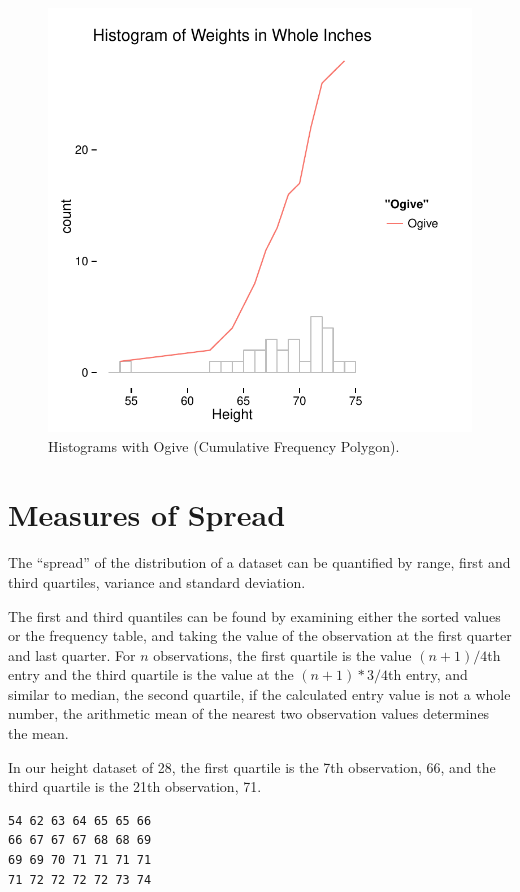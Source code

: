 \documentclass[nohyper,justified]{tufte-handout}\usepackage[]{graphicx}\usepackage[]{color}
\makeatletter
\newenvironment{kframe}{%
 \def\at@end@of@kframe{}%
 \ifinner\ifhmode%
  \def\at@end@of@kframe{\end{minipage}}%
  \begin{minipage}{\columnwidth}%
 \fi\fi%
 \def\FrameCommand##1{\hskip\@totalleftmargin \hskip-\fboxsep
 \colorbox{shadecolor}{##1}\hskip-\fboxsep
     \hskip-\linewidth \hskip-\@totalleftmargin \hskip\columnwidth}%
 \MakeFramed {\advance\hsize-\width
   \@totalleftmargin\z@ \linewidth\hsize
   \@setminipage}}%
 {\par\unskip\endMakeFramed%
 \at@end@of@kframe}
\newenvironment{knitrout}{}{} %
\makeatother
\begin{document}
\begin{knitrout}
\color{fgcolor}\begin{figure}

{\centering \includegraphics[width=.49\linewidth]{figure/graphics-ogive-1} 

}

\caption[Histograms with Ogive (Cumulative Frequency Polygon)]{Histograms with Ogive (Cumulative Frequency Polygon).}\label{fig:ogive}
\end{figure}


\end{knitrout}

\section{Measures of Spread}

The ``spread'' of the distribution of a dataset can be quantified by range, first and third quartiles, variance and standard deviation.

The first and third quantiles can be found by examining either the sorted values or the frequency table, and taking the value of the observation at the first quarter and last quarter. For $n$ observations, the first quartile is the value $(n+1)/4$th entry and the third quartile is the value at the $(n+1)*3/4$th entry, and similar to median, the second quartile, if the calculated entry value is not a whole number, the arithmetic mean of the nearest two observation values determines the mean.



In our height dataset of 28, the first quartile is the 7th observation, 66, and the third quartile is the 21th observation, 71.
\begin{knitrout}
\color{fgcolor}\begin{kframe}
\begin{verbatim}
54 62 63 64 65 65 66
66 67 67 67 68 68 69
69 69 70 71 71 71 71
71 72 72 72 72 73 74
\end{verbatim}
\end{kframe}
\end{knitrout}
\end{document}
